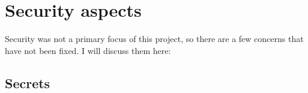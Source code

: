 



\section{Security aspects}

Security was not a primary focus of this project, so there are a few concerns that have not been fixed. I will discuss them here:

\subsection{Secrets}

